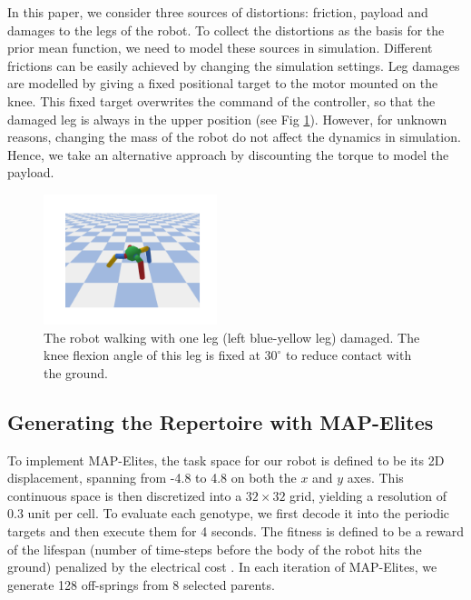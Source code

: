 \documentclass[journal]{IEEEtran}
\begin{document}
In this paper, we consider three sources of distortions: friction, payload and damages to the legs of the robot.
To collect the distortions as the basis for the prior mean function, we need to model these sources in simulation.
Different frictions can be easily achieved by changing the simulation settings.
Leg damages are modelled by giving a fixed positional target to the motor mounted on the knee.
This fixed target overwrites the command of the controller, so that the damaged leg is always in the upper position (see Fig \ref{damaged_robot}).
However, for unknown reasons, changing the mass of the robot do not affect the dynamics in simulation. 
Hence, we take an alternative approach by discounting the torque to model the payload.
%
%
\begin{figure}[h]
\centering
\includegraphics[width=0.45\textwidth]{damaged_robot.pdf}
\caption{The robot walking with one leg (left blue-yellow leg) damaged.
The knee flexion angle of this leg is fixed at $30^{\circ}$ to reduce contact with the ground.
}
\label{damaged_robot}
\end{figure}




\subsection{Generating the Repertoire with MAP-Elites}
To implement MAP-Elites, the task space for our robot is defined to be its 2D displacement, spanning from -4.8 to 4.8 on both the $x$ and $y$ axes. 
This continuous space is then discretized into a $32 \times 32$ grid, yielding a resolution of 0.3 unit per cell.
To evaluate each genotype, we first decode it into the periodic targets and then execute them for 4 seconds.
The fitness is defined to be a reward of the lifespan (number of time-steps before the body of the robot hits the ground) penalized by the electrical cost \cite{QDgym}.
In each iteration of MAP-Elites, we generate 128 off-springs from 8 selected parents.
\end{document}
